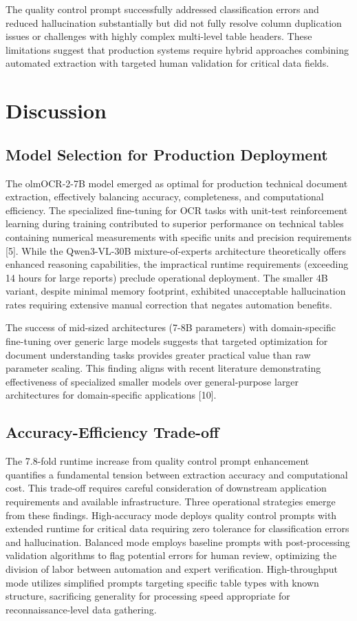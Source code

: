 \documentclass{svproc}
\begin{document}
The quality control prompt successfully addressed classification errors and reduced hallucination substantially but did not fully resolve column duplication issues or challenges with highly complex multi-level table headers. These limitations suggest that production systems require hybrid approaches combining automated extraction with targeted human validation for critical data fields.

\section{Discussion}

\subsection{Model Selection for Production Deployment}

The olmOCR-2-7B model emerged as optimal for production technical document extraction, effectively balancing accuracy, completeness, and computational efficiency. The specialized fine-tuning for OCR tasks with unit-test reinforcement learning during training contributed to superior performance on technical tables containing numerical measurements with specific units and precision requirements [5]. While the Qwen3-VL-30B mixture-of-experts architecture theoretically offers enhanced reasoning capabilities, the impractical runtime requirements (exceeding 14 hours for large reports) preclude operational deployment. The smaller 4B variant, despite minimal memory footprint, exhibited unacceptable hallucination rates requiring extensive manual correction that negates automation benefits.

The success of mid-sized architectures (7-8B parameters) with domain-specific fine-tuning over generic large models suggests that targeted optimization for document understanding tasks provides greater practical value than raw parameter scaling. This finding aligns with recent literature demonstrating effectiveness of specialized smaller models over general-purpose larger architectures for domain-specific applications [10].

\subsection{Accuracy-Efficiency Trade-off}

The 7.8-fold runtime increase from quality control prompt enhancement quantifies a fundamental tension between extraction accuracy and computational cost. This trade-off requires careful consideration of downstream application requirements and available infrastructure. Three operational strategies emerge from these findings. High-accuracy mode deploys quality control prompts with extended runtime for critical data requiring zero tolerance for classification errors and hallucination. Balanced mode employs baseline prompts with post-processing validation algorithms to flag potential errors for human review, optimizing the division of labor between automation and expert verification. High-throughput mode utilizes simplified prompts targeting specific table types with known structure, sacrificing generality for processing speed appropriate for reconnaissance-level data gathering.
\end{document}

